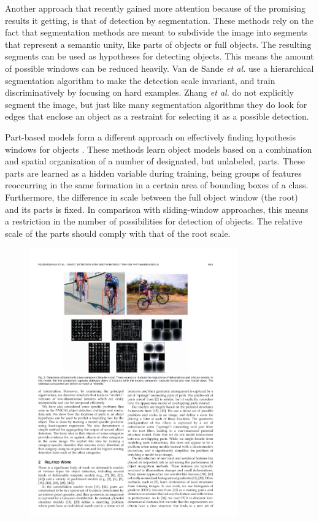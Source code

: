Another approach that recently gained more attention because of the promising results it getting, is that of detection by segmentation. \cite{van2011segmentation,zhang2010free} These methods rely on the fact that segmentation methods are meant to subdivide the image into segments that represent a semantic unity, like parts of objects or full objects. The resulting segments can be used as hypotheses for detecting objects. This means the amount of possible windows can be reduced heavily. Van de Sande \emph{et al.} \cite{van2011segmentation} use a hierarchical segmentation algorithm to make the detection scale invariant, and train discriminatively by focusing on hard examples. Zhang \emph{et al.} \cite{zhang2010free} do not explicitly segment the image, but just like many segmentation algorithms they do look for edges that enclose an object as a restraint for selecting it as a possible detection.

Part-based models form a different approach on effectively finding hypothesis windows for objects \cite{felzenszwalb2010object}. These methods learn object models based on a combination and spatial organization of a number of designated, but unlabeled, parts. These parts are learned as a hidden variable during training, being groups of features reoccurring in the same formation in a certain area of bounding boxes of a class. Furthermore, the difference in scale between the full object window (the root) and its parts is fixed. In comparison with sliding-window approaches, this means a restriction in the number of possibilities for detection of objects. The relative scale of the parts should comply with that of the root scale.


\begin{figure}[hbt]
    \centering
    \includegraphics[width=0.8\textwidth]{PartBasedDet}
    \caption{\cite{Felzenszwalb2010object}}
    \label{fig:partbaseddet}
\end{figure}


